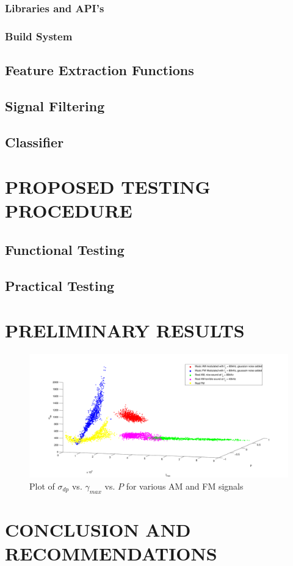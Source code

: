 \documentclass[10pt,twocolumn]{witseiepaper}
\begin{document}
		\subsubsection{Libraries and API's}

		\subsubsection{Build System}


	\subsection{Feature Extraction Functions}
	\label{subsec:feature_extract}

	\subsection{Signal Filtering}

	\subsection{Classifier}

\section{PROPOSED TESTING PROCEDURE}
	\subsection{Functional Testing}
	\subsection{Practical Testing}
\section{PRELIMINARY RESULTS}
	\begin{figure}[!h]
		\centering
		\includegraphics[width=1.1\textwidth]{plot0-eps-converted-to.pdf}
		\caption{Plot of $\sigma_{dp}$ vs. $\gamma_{max}$ vs. $P$ for various AM and FM signals}
		\label{fig:plot0}
	\end{figure}
\section{CONCLUSION AND RECOMMENDATIONS}




\end{document}
